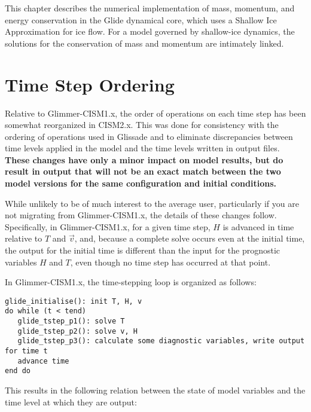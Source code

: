\label{ch:glide}

This chapter describes the numerical implementation of mass, momentum, and energy conservation in the Glide dynamical core,
which uses a Shallow Ice Approximation for ice flow. For a model governed by shallow-ice dynamics, 
the solutions for the conservation of mass and momentum are intimately linked.








\section{Time Step Ordering}

Relative to Glimmer-CISM1.x, the order of operations on each time step has been
somewhat reorganized in CISM2.x.  This was done for consistency with the ordering
of operations used in Glissade and to eliminate discrepancies between time levels
applied in the model and the time levels written in output files.  
\textbf{These changes have only a minor impact on model results, but do result 
in output that will not be an exact match between the two model versions for the
same configuration and initial conditions.}

While unlikely to be of much interest to the average user, particularly if you are not
migrating from Glimmer-CISM1.x, the details of these changes follow.
Specifically, in Glimmer-CISM1.x, for a given time step, $H$ is advanced in time
relative to $T$ and $\vec{v}$, and, because a complete solve occurs even at the 
initial time, the output for the initial time is different than the input for 
the prognostic variables $H$ and $T$, even though no time step has occurred at 
that point.

In Glimmer-CISM1.x, the time-stepping loop is organized as follows:
\begin{verbatim}
glide_initialise(): init T, H, v
do while (t < tend)
   glide_tstep_p1(): solve T
   glide_tstep_p2(): solve v, H
   glide_tstep_p3(): calculate some diagnostic variables, write output for time t
   advance time
end do
\end{verbatim}

\noindent This results in the following relation between the state of model variables and
the time level at which they are output:


